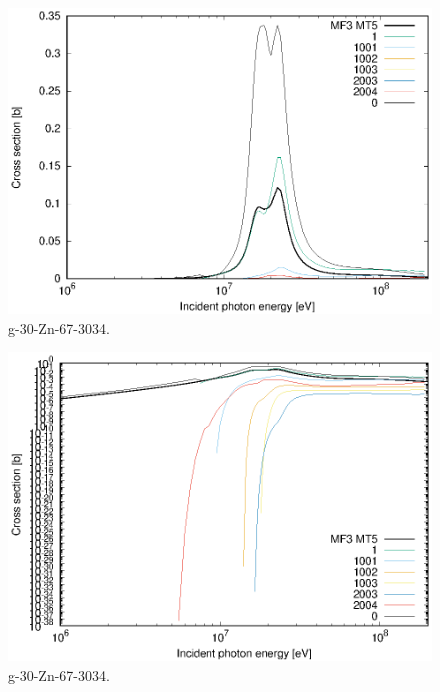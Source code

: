 \begin{figure}
 \includegraphics[width=\linewidth]{eps/g_30-Zn-67_3034.eps}
  \caption{g-30-Zn-67-3034.}
\end{figure}
\begin{figure}
 \includegraphics[width=\linewidth]{eps-log/g_30-Zn-67_3034.eps}
 \caption{g-30-Zn-67-3034.}
\end{figure}
\newpage \clearpage

